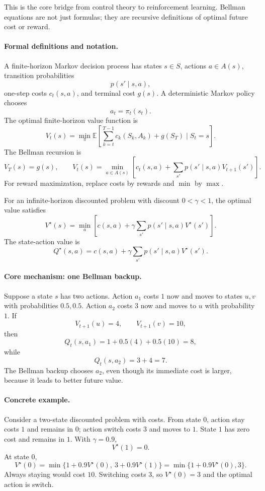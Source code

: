 This is the core bridge from control theory to reinforcement learning. Bellman equations are not just formulas; they are recursive definitions of optimal future cost or reward.

\paragraph{Formal definitions and notation.}
A finite-horizon Markov decision process has states \(s\in S\), actions \(a\in A(s)\), transition probabilities
\[
p(s'\mid s,a),
\]
one-step costs \(c_t(s,a)\), and terminal cost \(g(s)\). A deterministic Markov policy chooses
\[
a_t=\pi_t(s_t).
\]
The optimal finite-horizon value function is
\[
V_t(s)=\min_{\pi}\mathbb E\left[\sum_{k=t}^{T-1}c_k(S_k,A_k)+g(S_T)\mid S_t=s\right].
\]
The Bellman recursion is
\[
\boxed{
V_T(s)=g(s),
\qquad
V_t(s)=\min_{a\in A(s)}
\left[
c_t(s,a)+\sum_{s'}p(s'\mid s,a)V_{t+1}(s')
\right].
}
\]
For reward maximization, replace costs by rewards and \(\min\) by \(\max\).

For an infinite-horizon discounted problem with discount \(0<\gamma<1\), the optimal value satisfies
\[
\boxed{
V^\star(s)=\min_a\left[c(s,a)+\gamma\sum_{s'}p(s'\mid s,a)V^\star(s')\right].
}
\]
The state-action value is
\[
Q^\star(s,a)=c(s,a)+\gamma\sum_{s'}p(s'\mid s,a)V^\star(s').
\]

\paragraph{Core mechanism: one Bellman backup.}
Suppose a state \(s\) has two actions. Action \(a_1\) costs \(1\) now and moves to states \(u,v\) with probabilities \(0.5,0.5\). Action \(a_2\) costs \(3\) now and moves to \(u\) with probability \(1\). If
\[
V_{t+1}(u)=4,\qquad V_{t+1}(v)=10,
\]
then
\[
Q_t(s,a_1)=1+0.5(4)+0.5(10)=8,
\]
while
\[
Q_t(s,a_2)=3+4=7.
\]
The Bellman backup chooses \(a_2\), even though its immediate cost is larger, because it leads to better future value.

\paragraph{Concrete example.}
Consider a two-state discounted problem with costs. From state \(0\), action stay costs \(1\) and remains in \(0\); action switch costs \(3\) and moves to \(1\). State \(1\) has zero cost and remains in \(1\). With \(\gamma=0.9\),
\[
V^\star(1)=0.
\]
At state \(0\),
\[
V^\star(0)=\min\{1+0.9V^\star(0),\ 3+0.9V^\star(1)\}
=\min\{1+0.9V^\star(0),3\}.
\]
Always staying would cost \(10\). Switching costs \(3\), so \(V^\star(0)=3\) and the optimal action is switch.

